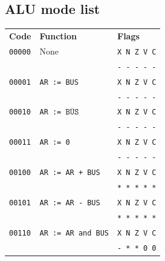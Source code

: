 \documentclass[]{article}
\begin{document}
\begin{appendices}
\newpage

\section{ALU mode list}

\begin{tabular}{lll}
  \textbf{Code} & \textbf{Function} & \textbf{Flags}\\
  \texttt{00000} & None & \texttt{X N Z V C}\\
  && \texttt{- - - - -}\\
  \texttt{00001} & \texttt{AR := BUS} & \texttt{X N Z V C}\\
  && \texttt{- - - - -}\\
  \texttt{00010} & \texttt{AR := $\overline{\texttt{BUS}}$} & \texttt{X N Z V C}\\
  && \texttt{- - - - -}\\
  \texttt{00011} & \texttt{AR := 0} & \texttt{X N Z V C}\\
  && \texttt{- - - - -}\\
  \texttt{00100} & \texttt{AR := AR + BUS} & \texttt{X N Z V C}\\
  && \texttt{* * * * *}\\
  \texttt{00101} & \texttt{AR := AR - BUS} & \texttt{X N Z V C}\\
  && \texttt{* * * * *}\\
  \texttt{00110} & \texttt{AR := AR and BUS} & \texttt{X N Z V C}\\
  && \texttt{- * * 0 0}
\end{tabular}


\end{appendices}
\end{document}
